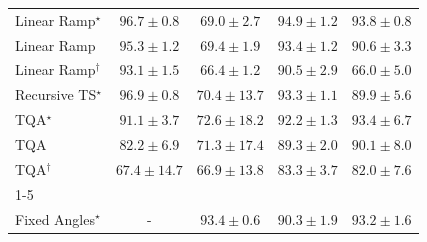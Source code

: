 \begin{tabular}{l|cccc|}
Linear Ramp$^\star$ & {\cellcolor[HTML]{712806}} \color[HTML]{F1F1F1} $96.7\pm 0.8$ & {\cellcolor[HTML]{FEC652}} \color[HTML]{000000} $69.0\pm 2.7$ & {\cellcolor[HTML]{812D05}} \color[HTML]{F1F1F1} $94.9\pm 1.2$ & {\cellcolor[HTML]{8B3005}} \color[HTML]{F1F1F1} $93.8\pm 0.8$ \\
Linear Ramp & {\cellcolor[HTML]{7C2C05}} \color[HTML]{F1F1F1} $95.3\pm 1.2$ & {\cellcolor[HTML]{FEC24D}} \color[HTML]{000000} $69.4\pm 1.9$ & {\cellcolor[HTML]{8E3104}} \color[HTML]{F1F1F1} $93.4\pm 1.2$ & {\cellcolor[HTML]{A83B03}} \color[HTML]{F1F1F1} $90.6\pm 3.3$ \\
Linear Ramp$^\dagger$ & {\cellcolor[HTML]{913204}} \color[HTML]{F1F1F1} $93.1\pm 1.5$ & {\cellcolor[HTML]{FED36F}} \color[HTML]{000000} $66.4\pm 1.2$ & {\cellcolor[HTML]{A83B03}} \color[HTML]{F1F1F1} $90.5\pm 2.9$ & {\cellcolor[HTML]{FED573}} \color[HTML]{000000} $66.0\pm 5.0$ \\
Recursive TS$^\star$ & {\cellcolor[HTML]{702806}} \color[HTML]{F1F1F1} $96.9\pm 0.8$ & {\cellcolor[HTML]{FEBB47}} \color[HTML]{000000} $70.4\pm 13.7$ & {\cellcolor[HTML]{903104}} \color[HTML]{F1F1F1} $93.3\pm 1.1$ & {\cellcolor[HTML]{AC3D03}} \color[HTML]{F1F1F1} $89.9\pm 5.6$ \\
TQA$^\star$ & {\cellcolor[HTML]{A33904}} \color[HTML]{F1F1F1} $91.1\pm 3.7$ & {\cellcolor[HTML]{FEAB39}} \color[HTML]{000000} $72.6\pm 18.2$ & {\cellcolor[HTML]{993404}} \color[HTML]{F1F1F1} $92.2\pm 1.3$ & {\cellcolor[HTML]{8E3104}} \color[HTML]{F1F1F1} $93.4\pm 6.7$ \\
TQA & {\cellcolor[HTML]{E3660F}} \color[HTML]{F1F1F1} $82.2\pm 6.9$ & {\cellcolor[HTML]{FEB541}} \color[HTML]{000000} $71.3\pm 17.4$ & {\cellcolor[HTML]{B34003}} \color[HTML]{F1F1F1} $89.3\pm 2.0$ & {\cellcolor[HTML]{AB3C03}} \color[HTML]{F1F1F1} $90.1\pm 8.0$ \\
TQA$^\dagger$ & {\cellcolor[HTML]{FECD63}} \color[HTML]{000000} $67.4\pm 14.7$ & {\cellcolor[HTML]{FED069}} \color[HTML]{000000} $66.9\pm 13.8$ & {\cellcolor[HTML]{DD5F0C}} \color[HTML]{F1F1F1} $83.3\pm 3.7$ & {\cellcolor[HTML]{E46710}} \color[HTML]{F1F1F1} $82.0\pm 7.6$ \\
\cline{1-5}
\multicolumn{5}{c}{\rule{0pt}{8pt}PP} \\
\midrule
Fixed Angles$^\star$ & {\cellcolor[HTML]{000000}} \color[HTML]{F1F1F1} {\cellcolor{white}} \color{black} - & {\cellcolor[HTML]{006034}} \color[HTML]{F1F1F1} $93.4\pm 0.6$ & {\cellcolor[HTML]{0B713B}} \color[HTML]{F1F1F1} $90.3\pm 1.9$ & {\cellcolor[HTML]{006234}} \color[HTML]{F1F1F1} $93.2\pm 1.6$ \\

\end{tabular}
